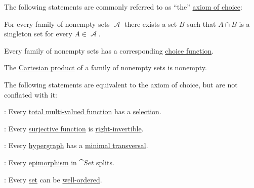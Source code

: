 \begin{theorem}\label{thm:axiom_of_choice_equivalences}
  The following statements are commonly referred to as \enquote{the} \hyperref[def:zfc/choice]{axiom of choice}:
  \begin{thmenum}[series=thm:axiom_of_choice_equivalences]
     For every family of nonempty sets \( \mscrA \) there exists a set \( B \) such that \( A \cap B \) is a singleton set for every \( A \in \mscrA \).

     Every family of nonempty sets has a corresponding \hyperref[def:choice_function]{choice function}.

     The \hyperref[def:tuple_and_cartesian_product]{Cartesian product} of a family of nonempty sets is nonempty.
  \end{thmenum}

  The following statements are equivalent to the axiom of choice, but are not conflated with it:
  \begin{thmenum}[resume=thm:axiom_of_choice_equivalences]
     : Every \hyperref[def:multi_valued_function/total]{total multi-valued function} has a \hyperref[def:function/selection]{selection}.

     : Every \hyperref[def:function_invertibility/surjective]{surjective function} is \hyperref[def:morphism_invertibility/right_invertible]{right-invertible}.

     : Every \hyperref[def:graph/hypergraph]{hypergraph} has a \hyperref[def:graph/hypergraph_minimal_transversal]{minimal transversal}.

     : Every \hyperref[def:morphism_invertibility/right_cancellative]{epimorphism} in \hyperref[def:category_of_small_sets]{\( \cat{Set} \)} splits.

     : Every \hyperref[def:set]{set} can be \hyperref[def:well_ordered_set]{well-ordered}.


\end{thmenum}
\end{theorem}
